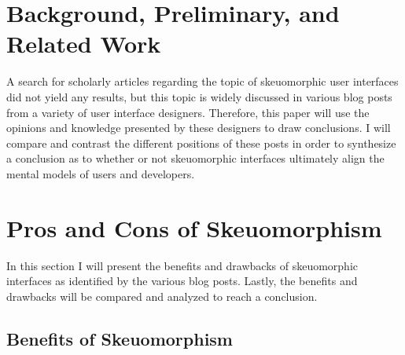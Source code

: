 \documentclass{article}
\begin{document}
\section{Background, Preliminary, and Related Work}

	A search for scholarly articles regarding the topic of skeuomorphic user interfaces did not yield any results, but this topic is widely discussed in various blog posts from a variety of user interface designers. Therefore, this paper will use the opinions and knowledge presented by these designers to draw conclusions. I will compare and contrast the different positions of these posts in order to synthesize a conclusion as to whether or not skeuomorphic interfaces ultimately align the mental models of users and developers.

\section{Pros and Cons of Skeuomorphism}
	In this section I will present the benefits and drawbacks of skeuomorphic interfaces as identified by the various blog posts. Lastly, the benefits and drawbacks will be compared and analyzed to reach a conclusion. 

\subsection{Benefits of Skeuomorphism}
\end{document}
